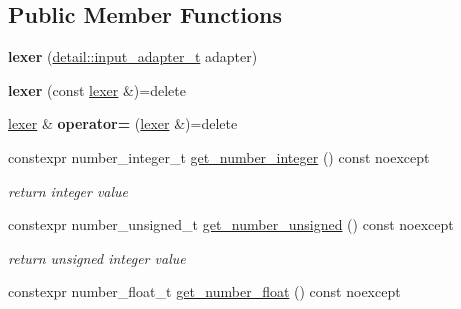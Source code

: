 \subsection*{Public Member Functions}
\begin{DoxyCompactItemize}
\item 
{\bfseries lexer} (\hyperlink{namespacenlohmann_1_1detail_ae132f8cd5bb24c5e9b40ad0eafedf1c2}{detail\+::input\+\_\+adapter\+\_\+t} adapter)\hypertarget{classnlohmann_1_1detail_1_1lexer_a0d7de7b99bc839ea9a39dd738d05d89c}{}\label{classnlohmann_1_1detail_1_1lexer_a0d7de7b99bc839ea9a39dd738d05d89c}

\item 
{\bfseries lexer} (const \hyperlink{classnlohmann_1_1detail_1_1lexer}{lexer} \&)=delete\hypertarget{classnlohmann_1_1detail_1_1lexer_a2e8ce2a0d266d148b69dfbcc2e4ad71a}{}\label{classnlohmann_1_1detail_1_1lexer_a2e8ce2a0d266d148b69dfbcc2e4ad71a}

\item 
\hyperlink{classnlohmann_1_1detail_1_1lexer}{lexer} \& {\bfseries operator=} (\hyperlink{classnlohmann_1_1detail_1_1lexer}{lexer} \&)=delete\hypertarget{classnlohmann_1_1detail_1_1lexer_a33e97dee7c5faf1b36aff5b74a6c8f55}{}\label{classnlohmann_1_1detail_1_1lexer_a33e97dee7c5faf1b36aff5b74a6c8f55}

\item 
constexpr number\+\_\+integer\+\_\+t \hyperlink{classnlohmann_1_1detail_1_1lexer_afa338d17c0a7e834c73104258a2c8ced}{get\+\_\+number\+\_\+integer} () const noexcept\hypertarget{classnlohmann_1_1detail_1_1lexer_afa338d17c0a7e834c73104258a2c8ced}{}\label{classnlohmann_1_1detail_1_1lexer_afa338d17c0a7e834c73104258a2c8ced}

\begin{DoxyCompactList}\small\item\em return integer value \end{DoxyCompactList}\item 
constexpr number\+\_\+unsigned\+\_\+t \hyperlink{classnlohmann_1_1detail_1_1lexer_a56640fb92293e0c17742ca3c814d74d6}{get\+\_\+number\+\_\+unsigned} () const noexcept\hypertarget{classnlohmann_1_1detail_1_1lexer_a56640fb92293e0c17742ca3c814d74d6}{}\label{classnlohmann_1_1detail_1_1lexer_a56640fb92293e0c17742ca3c814d74d6}

\begin{DoxyCompactList}\small\item\em return unsigned integer value \end{DoxyCompactList}\item 
constexpr number\+\_\+float\+\_\+t \hyperlink{classnlohmann_1_1detail_1_1lexer_ac013af35a21e9387993b19da5b3e0ae2}{get\+\_\+number\+\_\+float} () const noexcept\hypertarget{classnlohmann_1_1detail_1_1lexer_ac013af35a21e9387993b19da5b3e0ae2}{}\label{classnlohmann_1_1detail_1_1lexer_ac013af35a21e9387993b19da5b3e0ae2}


\end{DoxyCompactItemize}
